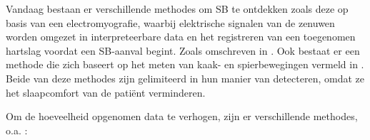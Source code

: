 \documentclass{hogent-article}
\begin{document}

Vandaag bestaan er verschillende methodes om SB te ontdekken zoals deze op basis van een electromyograﬁe, waarbij elektrische signalen van de zenuwen worden omgezet in interpreteerbare data en het registreren van een toegenomen hartslag voordat een SB-aanval begint.  Zoals omschreven in  \cite{Deregibus_2013}.  Ook bestaat er een methode die zich baseert op het meten van kaak- en spierbewegingen vermeld in \cite{Shochat_2007}  .  Beide van deze methodes zijn gelimiteerd in hun manier van detecteren, omdat ze het slaapcomfort van de patiënt verminderen. 

Om de hoeveelheid opgenomen data te verhogen, zijn  er verschillende methodes, o.a. :
\end{document}
